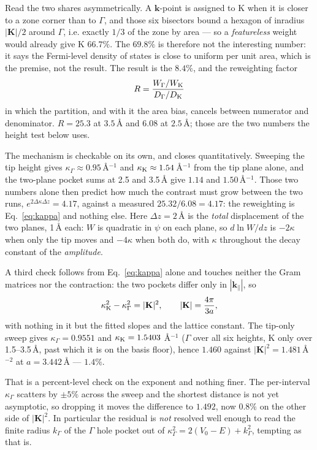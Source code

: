 \documentclass[11pt]{article}
\begin{document}
Read the two shares asymmetrically. A $\mathbf k$-point is assigned to K when
it is closer to a zone corner than to $\Gamma$, and those six bisectors bound a
hexagon of inradius $|\mathbf K|/2$ around $\Gamma$, i.e. exactly $1/3$ of the
zone by area --- so a \emph{featureless} weight would already give K $66.7\%$.
The $69.8\%$ is therefore not the interesting number: it says the Fermi-level
density of states is close to uniform per unit area, which is the premise, not
the result. The result is the $8.4\%$, and the reweighting factor
\begin{equation}
  R=\frac{W_\Gamma/W_{\rm K}}{D_\Gamma/D_{\rm K}}
  \label{eq:reweight}
\end{equation}
in which the partition, and with it the area bias, cancels between numerator
and denominator. $R=25.3$ at $3.5$\,\AA{} and $6.08$ at $2.5$\,\AA{}; those are
the two numbers the height test below uses.

The mechanism is checkable on its own, and closes quantitatively. Sweeping the
tip height gives $\kappa_\Gamma\approx0.95$\,\AA$^{-1}$ and
$\kappa_{\rm K}\approx1.54$\,\AA$^{-1}$ from the tip plane alone, and the
two-plane pocket sums at 2.5 and 3.5\,\AA{} give $1.14$ and
$1.50$\,\AA$^{-1}$. Those two numbers alone then predict how much the
contrast must grow between the two runs, $e^{2\Delta\kappa\Delta z}=4.17$,
against a measured $25.32/6.08=4.17$: the reweighting is
Eq.~\eqref{eq:kappa} and nothing else. Here $\Delta z=2$\,\AA{} is the
\emph{total} displacement of the two planes, 1\,\AA{} each: $W$ is quadratic in
$\psi$ on each plane, so $d\ln W/dz$ is $-2\kappa$ when only the tip moves and
$-4\kappa$ when both do, with $\kappa$ throughout the decay constant of the
\emph{amplitude}.

A third check follows from Eq.~\eqref{eq:kappa} alone and touches neither the
Gram matrices nor the contraction: the two pockets differ only in
$|\mathbf k_\parallel|$, so
\begin{equation}
  \kappa_{\rm K}^2-\kappa_\Gamma^2=|\mathbf K|^2,
  \qquad |\mathbf K|=\frac{4\pi}{3a},
  \label{eq:kappaid}
\end{equation}
with nothing in it but the fitted slopes and the lattice constant. The
tip-only sweep gives $\kappa_\Gamma=0.9551$ and $\kappa_{\rm K}=1.5403$
\AA$^{-1}$ ($\Gamma$ over all six heights, K only over 1.5--3.5\,\AA{}, past
which it is on the basis floor), hence $1.460$ against
$|\mathbf K|^2=1.481$\,\AA$^{-2}$ at $a=3.442$\,\AA{} --- $1.4\%$.

That is a percent-level check on the exponent and nothing finer. The
per-interval $\kappa_\Gamma$ scatters by $\pm5\%$ across the sweep and the
shortest distance is not yet asymptotic, so dropping it moves the difference to
$1.492$, now $0.8\%$ on the other side of $|\mathbf K|^2$. In particular the
residual is \emph{not} resolved well enough to read the finite radius
$k_\Gamma$ of the $\Gamma$ hole pocket out of
$\kappa_\Gamma^2=2(V_0-E)+k_\Gamma^2$, tempting as that is.
\end{document}
